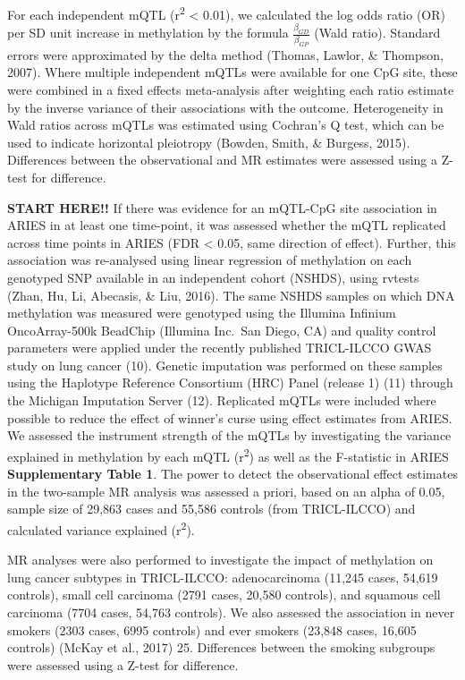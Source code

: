 \documentclass[11pt,twoside]{bristolthesis}
\begin{document}
For each independent mQTL (r\textsuperscript{2} \textless{} 0.01), we calculated the log odds ratio (OR) per SD unit increase in methylation by the formula \(\frac{\beta_{GD}} {\beta_{GP}}\) (Wald ratio). Standard errors were approximated by the delta method (Thomas, Lawlor, \& Thompson, 2007). Where multiple independent mQTLs were available for one CpG site, these were combined in a fixed effects meta-analysis after weighting each ratio estimate by the inverse variance of their associations with the outcome. Heterogeneity in Wald ratios across mQTLs was estimated using Cochran's Q test, which can be used to indicate horizontal pleiotropy (Bowden, Smith, \& Burgess, 2015). Differences between the observational and MR estimates were assessed using a Z-test for difference.

\textbf{START HERE!!}
If there was evidence for an mQTL-CpG site association in ARIES in at least one time-point, it was assessed whether the mQTL replicated across time points in ARIES (FDR \textless{} 0.05, same direction of effect). Further, this association was re-analysed using linear regression of methylation on each genotyped SNP available in an independent cohort (NSHDS), using rvtests (Zhan, Hu, Li, Abecasis, \& Liu, 2016). The same NSHDS samples on which DNA methylation was measured were genotyped using the Illumina Infinium OncoArray-500k BeadChip (Illumina Inc.~San Diego, CA) and quality control parameters were applied under the recently published TRICL-ILCCO GWAS study on lung cancer (10). Genetic imputation was performed on these samples using the Haplotype Reference Consortium (HRC) Panel (release 1) (11) through the Michigan Imputation Server (12). Replicated mQTLs were included where possible to reduce the effect of winner's curse using effect estimates from ARIES. We assessed the instrument strength of the mQTLs by investigating the variance explained in methylation by each mQTL (r\textsuperscript{2}) as well as the F-statistic in ARIES \textbf{Supplementary Table 1}. The power to detect the observational effect estimates in the two-sample MR analysis was assessed a priori, based on an alpha of 0.05, sample size of 29,863 cases and 55,586 controls (from TRICL-ILCCO) and calculated variance explained (r\textsuperscript{2}).

MR analyses were also performed to investigate the impact of methylation on lung cancer subtypes in TRICL-ILCCO: adenocarcinoma (11,245 cases, 54,619 controls), small cell carcinoma (2791 cases, 20,580 controls), and squamous cell carcinoma (7704 cases, 54,763 controls). We also assessed the association in never smokers (2303 cases, 6995 controls) and ever smokers (23,848 cases, 16,605 controls) (McKay et al., 2017) 25. Differences between the smoking subgroups were assessed using a Z-test for difference.
\end{document}
